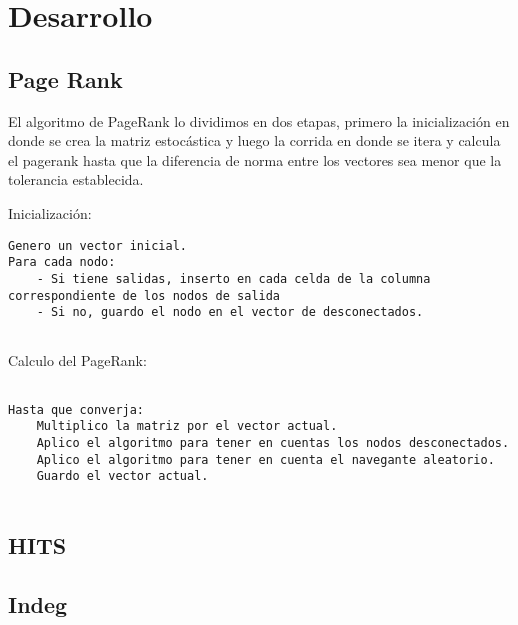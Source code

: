 \section{Desarrollo}

\subsection{Page Rank}
El algoritmo de PageRank lo dividimos en dos etapas, primero la inicializaci\'on en donde se crea la matriz estoc\'astica y luego la corrida en donde se itera y calcula el pagerank hasta que la diferencia de norma entre los vectores sea menor que la tolerancia establecida.

Inicializaci\'on:
\begin{lstlisting}[frame=single]  
Genero un vector inicial.
Para cada nodo:
	- Si tiene salidas, inserto en cada celda de la columna correspondiente de los nodos de salida
	- Si no, guardo el nodo en el vector de desconectados.
	
\end{lstlisting}

Calculo del PageRank:
\begin{lstlisting}[frame=single] 

Hasta que converja:
	Multiplico la matriz por el vector actual.
	Aplico el algoritmo para tener en cuentas los nodos desconectados.
	Aplico el algoritmo para tener en cuenta el navegante aleatorio.
	Guardo el vector actual.
	
\end{lstlisting}


\subsection{HITS}

\subsection{Indeg}


